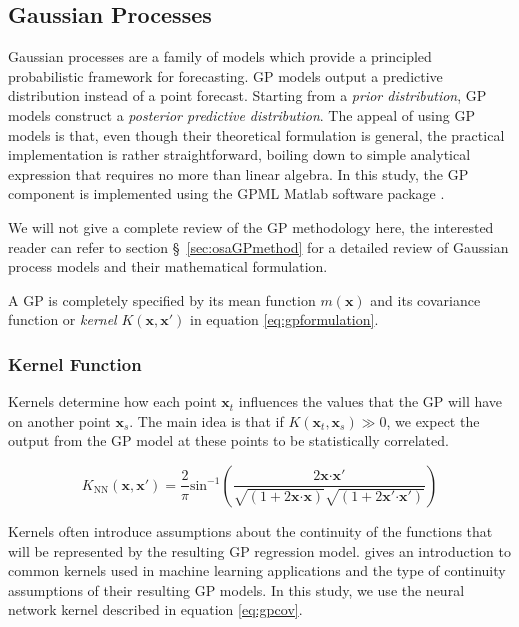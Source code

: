 \subsection{Gaussian Processes}\label{sec:gpcomponent}

Gaussian processes are a family of models which provide a principled probabilistic framework for forecasting.
GP models output a predictive distribution instead of a point forecast. Starting from a \emph{prior distribution},
GP models construct a \emph{posterior predictive distribution}. The appeal of using GP models is that, even though 
their theoretical formulation is general, the practical implementation is rather straightforward, boiling down to 
simple analytical expression that requires no more than linear algebra. In this study, the GP component is 
implemented using the GPML Matlab software package \citep{rasmussen2010gaussian}. 

We will not give a complete review of the GP methodology here, the interested reader can refer to 
section \S~\ref{sec:osaGPmethod} for a detailed review of Gaussian process models and their mathematical formulation.

A GP is completely specified by its mean function  $m \left( \mathbf{x} \right)$ and its covariance function 
or \emph{kernel} $K (\mathbf{x}, \mathbf{x}')$ in equation \ref{eq:gpformulation}.

\subsubsection*{Kernel Function}

Kernels determine how each point $\mathbf{x}_t$ influences the values that the GP will have on another point 
$\mathbf{x}_s$. The main idea is that if $K(\mathbf{x}_t, \mathbf{x}_s) \gg 0$, we expect the output from the 
GP model at these points to be statistically correlated. 

\begin{equation}\label{eq:gpcov}
	K_{\text{NN}} \left( \mathbf{x}, \mathbf{x}' \right) = 
	\frac{2}{ \pi } \text{sin}^{-1} \left( \frac{2\mathbf{x}\boldsymbol{\cdot}\mathbf{x}'}{
		\sqrt{ \left( 1+2\mathbf{x}\boldsymbol{\cdot} \mathbf{x} \right)}\sqrt{\left( 1+2\mathbf{x}'\boldsymbol{\cdot}\mathbf{x}' \right)}
		} \right)
\end{equation}

Kernels often introduce assumptions about the continuity of the functions that will be 
represented by the resulting GP regression model. \citet[ch.~4]{Rasmussen:2005:GPM:1162254} gives an 
introduction to common kernels used in machine learning applications and the type of continuity assumptions 
of their resulting GP models. In this study, we use the neural network kernel \citep{williams1998computation} 
described in equation \ref{eq:gpcov}. 

